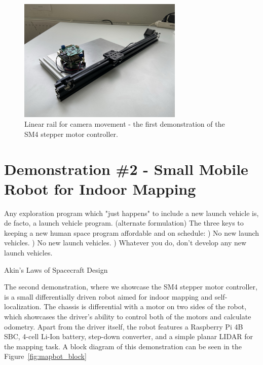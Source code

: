 \begin{figure}[H]
    \centering
    \includegraphics[width=0.7\textwidth]{obrazky/rail}
    \caption{Linear rail for camera movement - the first demonstration of the SM4 stepper motor controller.}
    \label{fig:rail_demonstrator}
\end{figure}

\section{Demonstration \#2 - Small Mobile Robot for Indoor Mapping}
\label{sec:dem1}
\epigraph{
    Any exploration program which "just happens" to include a new launch vehicle is, de facto, a launch vehicle program. \newline\newline
    (alternate formulation) The three keys to keeping a new human space program affordable and on schedule: )  No new launch vehicles. )  No new launch vehicles. )  Whatever you do, don't develop any new launch vehicles.}{Akin's Laws of Spacecraft Design\cite{akin_akins_nodate}}

The second demonstration, where we showcase the SM4 stepper motor controller, is a small differentially driven robot aimed for indoor mapping and self-localization.
The chassis is differential with a motor on two sides of the robot, which showcases the driver's ability to control both of the motors and calculate odometry.
Apart from the driver itself, the robot features a Raspberry Pi 4B SBC, 4-cell Li-Ion battery, step-down converter, and a simple planar LIDAR for the mapping task.
A block diagram of this demonstration can be seen in the Figure~\ref{fig:mapbot_block}

